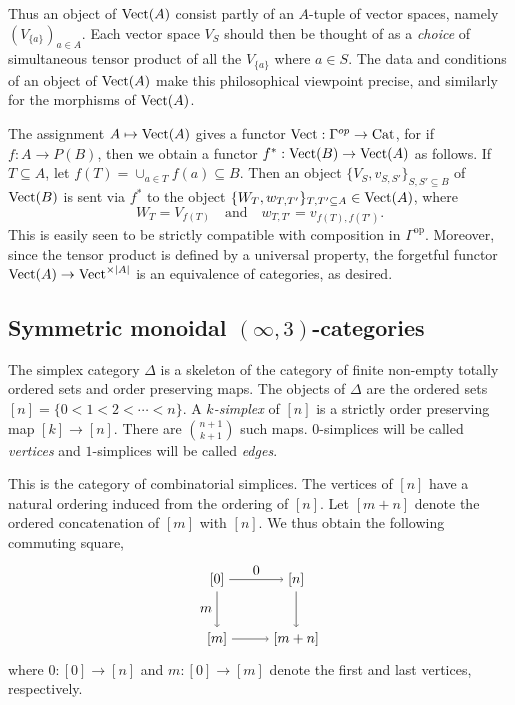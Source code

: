 \documentclass{amsart}
\begin{document}
Thus an object of $\mathrm{Vect}(A)$ consist partly of an $A$-tuple of vector spaces, namely $ (V_{\{a\}})_{a \in A}$. Each vector space $V_S$ should then be thought of as a {\em choice} of simultaneous tensor product of all the $V_{\{a\}}$ where $a \in S$. The data and conditions of an object of $\mathrm{Vect}(A)$ make this philosophical viewpoint precise, and similarly for the morphisms of $\mathrm{Vect}(A)$. 

The assignment $A \mapsto \mathrm{Vect}(A)$ gives a functor $\mathrm{Vect}: \Gamma^{op} \to \mathrm{Cat}$, for if $f: A \to P(B)$, then we obtain a functor $f^*: \mathrm{Vect}(B) \to \mathrm{Vect}(A)$ as follows. If $T \subseteq A$, let $f(T) = \cup_{a \in T} f(a) \subseteq B$. Then an object $\{ V_S, v_{S,S'} \}_{S, S' \subseteq B}$ of $\mathrm{Vect}(B)$ is sent via $f^*$ to the object $\{ W_T, w_{T, T'} \}_{T, T' \subseteq A} \in \mathrm{Vect}(A)$, where 
\begin{equation*}
	W_T = V_{f(T)} \quad \textrm{and} \quad  w_{T, T'} = v_{f(T), f(T')}.
\end{equation*}
This is easily seen to be strictly compatible with composition in $\Gamma^\text{op}$. Moreover, since the tensor product is defined by a universal property, the forgetful functor $\mathrm{Vect}(A) \to \mathrm{Vect}^{\times |A|}$ is an equivalence of categories, as desired.  


\subsection{Symmetric monoidal $(\infty,3)$-categories}

\begin{definition}
	The simplex category $\Delta$ is a skeleton of the category of finite non-empty totally ordered sets and order preserving maps. The objects of $\Delta$ are the ordered sets $[n] = \{ 0 < 1 < 2 < \cdots < n\}$. A {\em $k$-simplex} of $[n]$ is a strictly order preserving map $[k] \to [n]$. There are $ {n+1}\choose {k+1}$ such maps. $0$-simplices will be called {\em vertices} and $1$-simplices will be called {\em edges}. 
\end{definition}

This is the category of combinatorial simplices. The vertices of $[n]$ have a natural ordering induced from the ordering of $[n]$. Let $[m + n]$ denote the ordered concatenation of $[m]$ with $[n]$. We thus obtain the following commuting square,
\begin{equation} \label{Eqn:Segal-Co-Map}
\begin{tikzpicture}[baseline = 0.75cm]
	\node (LT) at (0, 1.5) {$[0]$};
	\node (LB) at (0, 0) {$[m]$};
	\node (RT) at (2, 1.5) {$[n]$};
	\node (RB) at (2, 0) {$[m+n]$};
	\draw [->] (LT) -- node [left] {$m$} (LB);
	\draw [->] (LT) -- node [above] {$0$} (RT);
	\draw [->] (RT) -- node [right] {$$} (RB);
	\draw [->] (LB) -- node [below] {$$} (RB);
\end{tikzpicture}
\end{equation}
where $0: [0] \to [n]$ and $m: [0] \to [m]$ denote the first and last vertices, respectively. 
\end{document}
